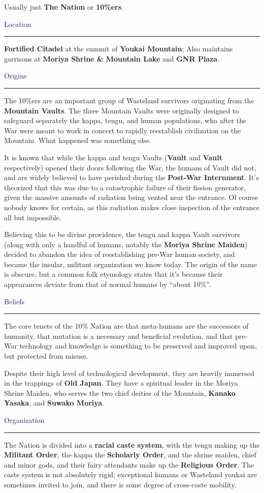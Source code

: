 \documentclass[a4paper,12pt]{book}
\newcommand{\maru}[1]{\raisebox{.5pt}{\textcircled{\raisebox{-.9pt} {#1}}}}
\newcommand{\factionheading}[1]{
\parbox{\textwidth}{
        \vspace{2mm}
        \noindent
        \textcolor{MidnightBlue}{
{\large {#1}
        \vspace*{1mm}
        \hrule}
        \vspace*{3mm}
        \noindent
} } }
\begin{document}
Usually just \textbf{The Nation} or \textbf{10\%ers}.

\factionheading{Location}
\textbf{Fortified Citadel} at the summit of \textbf{Youkai Mountain}; Also maintains garrisons at \textbf{Moriya Shrine \& Mountain Lake} and \textbf{GNR Plaza}.

\factionheading{Origins}
The 10\%ers are an important group of Wasteland survivors originating from the \textbf{Mountain Vaults}. The three Mountain Vaults were originally designed to safeguard separately the kappa, tengu, and human populations, who after the War were meant to work in concert to rapidly reestablish civilization on the Mountain. What happened was something else.

It is known that while the kappa and tengu Vaults (\textbf{Vault \maru{11}} and \textbf{Vault \maru{12}} respectively) opened their doors following the War, the humans of {Vault \maru{13}} did not, and are widely believed to have perished during the \textbf{Post-War Internment}. It’s theorized that this was due to a catastrophic failure of their fission generator, given the massive amounts of radiation being vented near the entrance. Of course nobody knows for certain, as this radiation makes close inspection of the entrance all but impossible.

Believing this to be divine providence, the tengu and kappa Vault survivors (along with only a handful of humans, notably the \textbf{Moriya Shrine Maiden}) decided to abandon the idea of reestablishing pre-War human society, and became the insular, militant organization we know today. The origin of the name is obscure, but a common folk etymology states that it’s because their appearances deviate from that of normal humans by ``about 10\%''. 

\factionheading{Beliefs}
The core tenets of the 10\% Nation are that meta-humans are the successors of humanity, that mutation is a necessary and beneficial evolution, and that pre-War technology and knowledge is something to be preserved and improved upon, but protected from misuse.

Despite their high level of technological development, they are heavily immersed in the trappings of \textbf{Old Japan}. They have a spiritual leader in the Moriya Shrine Maiden, who serves the two chief deities of the Mountain, \textbf{Kanako Yasaka}, and \textbf{Suwako Moriya}.

\factionheading{Organization}
The Nation is divided into a \textbf{racial caste system}, with the tengu making up the \textbf{Militant Order}, the kappa the \textbf{Scholarly Order}, and the shrine maiden, chief and minor gods, and their fairy attendants make up the \textbf{Religious Order}. The caste system is not absolutely rigid; exceptional humans or Wasteland youkai are sometimes invited to join, and there is some degree of cross-caste mobility.
\end{document}
